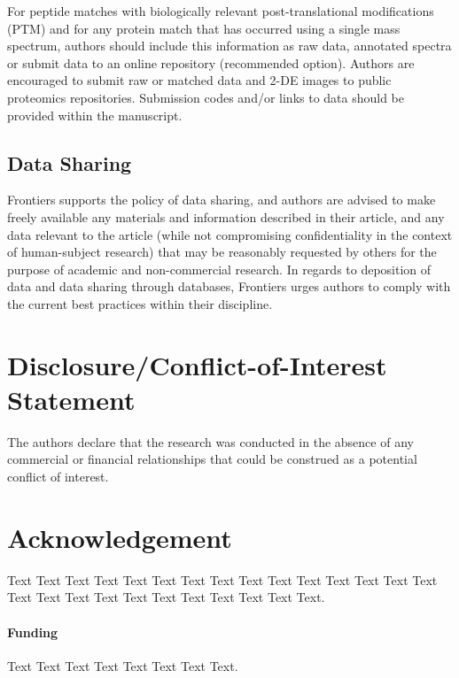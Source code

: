 \documentclass{frontiersMED} %
\begin{document}
For peptide matches with biologically relevant post-translational modifications (PTM) and for any protein match that has occurred using a single mass spectrum, authors should include this information as raw data, annotated spectra or submit data to an online repository (recommended option).
Authors are encouraged to submit raw or matched data and 2-DE images to public proteomics repositories. Submission codes and/or links to data should be provided within the manuscript.

\subsection{Data Sharing}

Frontiers supports the policy of data sharing, and authors are advised to make freely available any materials and information described in their article, and any data relevant to the article (while not compromising confidentiality in the context of human-subject research) that may be reasonably requested by others for the purpose of academic and non-commercial research. In regards to deposition of data and data sharing through databases, Frontiers urges authors to comply with the current best practices within their discipline.

\section*{Disclosure/Conflict-of-Interest Statement}
The authors declare that the research was conducted in the absence of any commercial or financial relationships that could be construed as a potential conflict of interest.

\section*{Acknowledgement}
Text Text Text Text Text Text  Text Text Text Text Text Text Text Text  Text Text Text Text Text Text Text Text Text  Text Text Text.

\paragraph{Funding\textcolon} Text Text Text Text Text Text  Text Text.
\end{document}
